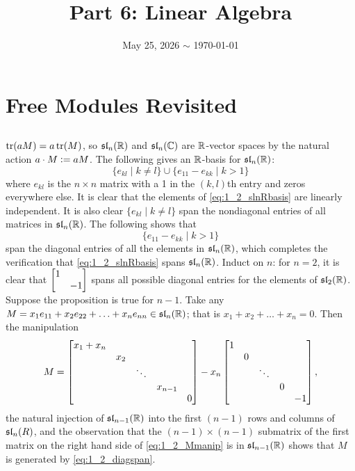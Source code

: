 \documentclass[12pt]{article}
\title{\course\ \\ Part 6: Linear Algebra}
\author{\myname}
\date{May 25, 2026 $\sim$ \today}
\begin{document}
\maketitle
\thispagestyle{fancy}

\newcommand{\dirsum}[2]{#1^{\oplus#2}}
\newcommand{\rmod}[1]{#1\text{-module}\xspace}


\section{Free Modules Revisited}
\setcounter{subsection}{1}
\subsection{} 
$\tr(aM) = a\tr(M)$, so $\sl{n}{\R}$ and $\sl{n}{\C}$ are $\R$-vector spaces by the natural action $a \cdot M \defeq aM$. 
The following gives an $\R$-basis for $\sl{n}{\R}$: 
\begin{equation} \label{eq:1_2_slnRbasis}
  \{e_{kl} \mid k \neq l\} \cup \{e_{11} - e_{kk} \mid k > 1\}
\end{equation}
where $e_{kl}$ is the $n \times n$ matrix with a 1 in the $(k, l)$th entry and zeros everywhere else. 
It is clear that the elements of \eqref{eq:1_2_slnRbasis} are linearly independent. 
It is also clear $\{e_{kl} \mid k \neq l\}$ span the nondiagonal entries of all matrices in $\sl{n}{\R}$. 
The following shows that 
\begin{equation} \label{eq:1_2_diagspan}
  \{e_{11} - e_{kk} \mid k > 1\}
\end{equation}
span the diagonal entries of all the elements in $\sl{n}{\R}$, which completes the verification that \eqref{eq:1_2_slnRbasis} spans $\sl{n}{\R}$. 
Induct on $n$: 
for $n = 2$, it is clear that $\bmat{1 \\ & -1}$ spans all possible diagonal entries for the elements of $\sl{2}{\R}$. 
Suppose the proposition is true for $n - 1$. 
Take any $M = x_1 e_{11} + x_2 e_{22} + \ldots + x_n e_{nn} \in \sl{n}{\R}$; 
that is $x_1 + x_2 + \ldots + x_n = 0$.
Then the manipulation
\begin{equation} \label{eq:1_2_Mmanip}
M = \bmat{x_1 + x_n \\ & x_2 \\ & & \ddots \\ & & & x_{n - 1} \\ & & & & 0} - x_n \bmat{1 \\ &  0 \\ & & \ddots \\ & & & 0 \\ & & & & -1},
\end{equation}
the natural injection of $\sl{n - 1}{\R}$ into the first $(n - 1)$ rows and columns of $\sl{n}{R}$, and the observation that the $(n - 1) \times (n - 1)$ submatrix of the first matrix on the right hand side of \eqref{eq:1_2_Mmanip} is in $\sl{n - 1}{\R}$ shows that $M$ is generated by \eqref{eq:1_2_diagspan}.
\end{document}
